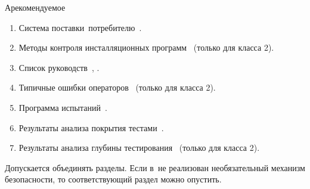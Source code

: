 \begin{appendix}{А}{рекомендуемое}
\begin{enumerate}
\begin{enumerate}
\item
Система поставки~\TOE потребителю~.

\item
Методы контроля инсталляционных программ~
(только для класса 2).

\item
Список руководств~, .

\item
Типичные ошибки операторов~
(только для класса 2).

\item
Программа испытаний~.

\item
Результаты анализа покрытия тестами~.

\item
Результаты анализа глубины тестирования~
(только для класса 2).
\end{enumerate}
\end{enumerate}

Допускается объединять разделы.
Если в~\TOE не реализован необязательный механизм безопасности, 
то соответствующий раздел можно опустить.

\end{appendix}

